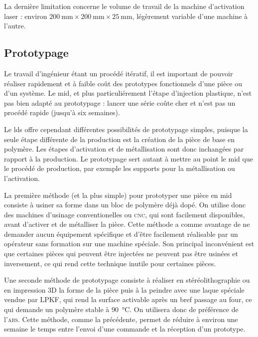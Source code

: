 
La dernière limitation concerne le volume de travail de la machine d'activation laser : environ $\SI{200}{\milli\meter}\times\SI{200}{\milli\meter}\times\SI{25}{\milli\meter}$, légèrement variable d'une machine à l'autre.

\subsection{Prototypage}
Le travail d'ingénieur étant un procédé itératif, il est important de pouvoir réaliser rapidement et à faible coût des prototypes fonctionnels d'une pièce ou d'un système.
Le \gls{mid}, et plus particuliérement l'étape d'injection plastique, n'est pas bien adapté au prototypage : lancer une série coûte cher et n'est pas un procédé rapide (jusqu'à six semaines).

Le \gls{lds} offre cependant différentes possibilités de prototypage simples, puisque la seule étape différente de la production est la création de la pièce de base en polymère.
Les étapes d'activation et de métallisation sont donc inchangées par rapport à la production.
Le prototypage sert autant à mettre au point le \gls{mid} que le procédé de production, par exemple les supports pour la métallisation ou l'activation.

La première méthode (et la plus simple) pour prototyper une pièce en \gls{mid} consiste à usiner sa forme dans un bloc de polymère déjà dopé.
On utilise donc des machines d'usinage conventionelles ou \textsc{cnc}, qui sont facilement disponibles, avant d'activer et de métalliser la pièce.
Cette méthode a comme avantage de ne demander aucun équipement spécifique et d'être facilement réalisable par un opérateur sans formation sur une machine spéciale.
Son principal inconvénient est que certaines pièces qui peuvent être injectées ne peuvent pas être usinées et inversement, ce qui rend cette technique inutile pour certaines pièces.

Une seconde méthode de prototypage consiste à réaliser en stéréolithographie ou en impression 3D la forme de la pièce puis à la peindre avec une laque spéciale vendue par LPKF, qui rend la surface activable après un bref passage au four, ce qui demande un polymère stable à \SI{90}{\celsius}.
On utilisera donc de préférence de l'\textsc{abs}.
Cette méthode, comme la précédente, permet de réduire à environ une semaine le temps entre l'envoi d'une commande et la réception d'un prototype.

